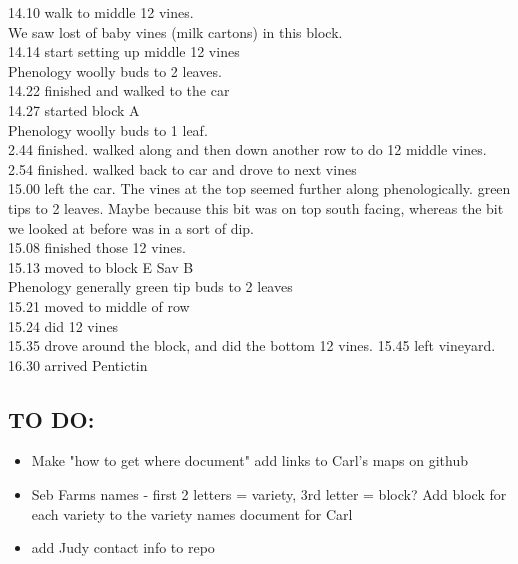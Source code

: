 \documentclass[11pt,letter]{article}
\newenvironment{smitemize}{
\begin{itemize}
  \setlength{\itemsep}{0pt}
  \setlength{\parskip}{0.8pt}
  \setlength{\parsep}{0pt}}
{\end{itemize}
}
\begin{document}
\begin{smitemize}
14.10 walk to middle 12 vines. \\
We saw lost of baby vines (milk cartons) in this block. \\
14.14 start setting up middle 12 vines \\
Phenology woolly buds to 2 leaves. \\
14.22 finished and walked to the car\\
14.27 started block A \\
Phenology woolly buds to 1 leaf. \\
2.44 finished. walked along and then down another row to do 12 middle vines. \\
2.54 finished. walked back to car and drove to next vines\\
15.00 left the car.
The vines at the top seemed further along phenologically. green tips to 2 leaves. Maybe because this bit was on top south facing, whereas the bit we looked at before was in a sort of dip. \\
15.08 finished those 12 vines.\\ 
15.13 moved to block E Sav B\\
Phenology generally green tip buds to 2 leaves \\
15.21 moved to middle of row\\
15.24 did 12 vines \\
15.35 drove around the block, and did the bottom 12 vines.
15.45 left vineyard.
16.30 arrived Pentictin

\end{smitemize}


\subsection{TO DO:}
\begin{smitemize}
\item Make "how to get where document" add links to Carl's maps on github
\item Seb Farms names - first 2 letters = variety, 3rd letter = block? Add block for each variety to the variety names document for Carl
\item add Judy contact info to repo

\end{smitemize}
\end{document}
